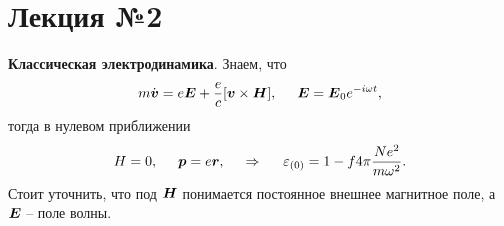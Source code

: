 \section*{Лекция №2}

\textbf{Классическая электродинамика}.
Знаем, что
\begin{equation*}
    m \dot{\mbox{\boldmath $v$}} = e \mbox{\boldmath $E$} + \frac{e}{c} [\mbox{\boldmath $v$} \times  \mbox{\boldmath $H$}],
    \hspace{5 mm} 
    \mbox{\boldmath $E$} = \mbox{\boldmath $E$}_0 e^{-i \omega t},
\end{equation*}
тогда в нулевом приближении
\begin{equation*}
    H = 0,
    \hspace{5 mm} 
    \mbox{\boldmath $p$} = e \mbox{\boldmath $r$},
    \hspace{0.5cm} \Rightarrow \hspace{0.5cm}  
    \varepsilon_{(0)} = 1 - f4 \pi \frac{N e^2}{m \omega^2}.
\end{equation*}
Стоит уточнить, что под $\mbox{\boldmath $H$}$ понимается постоянное внешнее магнитное  поле, а $\mbox{\boldmath $E$}$ -- поле волны.



